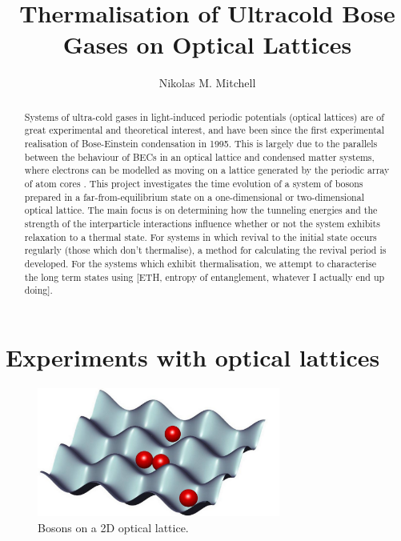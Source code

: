 \documentclass[a4paper,10pt]{article}
\title{Thermalisation of Ultracold Bose Gases on Optical Lattices}
\author{Nikolas M. Mitchell}
\begin{document}
\maketitle

\begin{abstract}

Systems of ultra-cold gases in light-induced periodic potentials (optical lattices) are of great experimental and theoretical interest, and have been since the first experimental 
realisation of Bose-Einstein condensation in 1995. 
This is largely due to the parallels between the behaviour of BECs in an optical lattice and condensed matter systems, where 
electrons can be modelled as moving on a lattice generated by the periodic array of atom cores \cite{Bloch2012}. This project 
investigates the time evolution of a system of bosons prepared in a far-from-equilibrium state on a one-dimensional or two-dimensional
optical lattice. The main focus is on determining how the tunneling energies and the strength of the interparticle interactions influence
whether or not the system exhibits relaxation to a thermal state. For systems in which revival to the initial state occurs regularly (those which don't thermalise), 
a method for calculating the revival period is developed. For the systems which exhibit thermalisation, we attempt to characterise the long term
states using [ETH, entropy of entanglement, whatever I actually end up doing].


\end{abstract}
\newpage
\section{Experiments with optical lattices}
 
\begin{figure}[H]
 \begin{center}
   \includegraphics[width=8cm]{bosons_on_lattice}
 \end{center}
 \caption{Bosons on a 2D optical lattice.}
 \end{figure}
\end{document}

